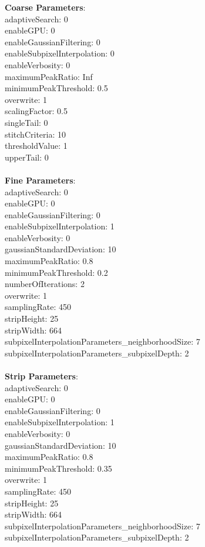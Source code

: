 \documentclass[11pt]{article}
\begin{document}
\textbf{Coarse Parameters}: \\
adaptiveSearch: 0\\
enableGPU: 0\\
enableGaussianFiltering: 0\\
enableSubpixelInterpolation: 0\\
enableVerbosity: 0\\
maximumPeakRatio: Inf\\
minimumPeakThreshold: 0.5\\
overwrite: 1\\
scalingFactor: 0.5\\
singleTail: 0\\
stitchCriteria: 10\\
thresholdValue: 1\\
upperTail: 0\\
\\
\textbf{Fine Parameters}: \\
adaptiveSearch: 0\\
enableGPU: 0\\
enableGaussianFiltering: 0\\
enableSubpixelInterpolation: 1\\
enableVerbosity: 0\\
gaussianStandardDeviation: 10\\
maximumPeakRatio: 0.8\\
minimumPeakThreshold: 0.2\\
numberOfIterations: 2\\
overwrite: 1\\
samplingRate: 450\\
stripHeight: 25\\
stripWidth: 664\\
subpixelInterpolationParameters\_neighborhoodSize: 7\\
subpixelInterpolationParameters\_subpixelDepth: 2\\
\\
\textbf{Strip Parameters}: \\
adaptiveSearch: 0\\
enableGPU: 0\\
enableGaussianFiltering: 0\\
enableSubpixelInterpolation: 1\\
enableVerbosity: 0\\
gaussianStandardDeviation: 10\\
maximumPeakRatio: 0.8\\
minimumPeakThreshold: 0.35\\
overwrite: 1\\
samplingRate: 450\\
stripHeight: 25\\
stripWidth: 664\\
subpixelInterpolationParameters\_neighborhoodSize: 7\\
subpixelInterpolationParameters\_subpixelDepth: 2\\
\\
\newpage
\end{document}
